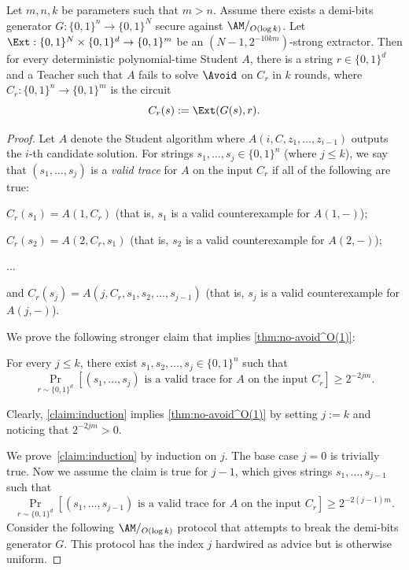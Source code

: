 \begin{theorem}\label{thm:no-avoid^O(1)}
    Let $m, n, k$ be parameters such that $m > n$. Assume there exists a demi-bits generator $G: \{0,1\}^n \to \{0,1\}^N$ secure against $\AM/_{O(\log k)}$. Let $\Ext: \{0,1\}^N \times \{0,1\}^d \to \{0,1\}^m$ be an $(N-1, 2^{-10km})$-strong extractor. Then for every deterministic polynomial-time Student $A$, there is a string $r\in \{0,1\}^d$ and a Teacher such that $A$ fails to solve $\Avoid$ on $C_r$ in $k$ rounds, where $C_r: \{0,1\}^n \to \{0,1\}^m$ is the circuit
    \[C_r(s) := \Ext(G(s), r).\]
\end{theorem}
\begin{proof}
    Let $A$ denote the Student algorithm where $A(i, C, z_1, \dots, z_{i-1})$ outputs the $i$-th candidate solution. For strings $s_1, \dots, s_j\in \{0,1\}^n$ (where $j\le k$), we say that $(s_1, \dots, s_j)$ is a \emph{valid trace} for $A$ on the input $C_r$ if all of the following are true:
    \begin{compactitem}
        \item $C_r(s_1) = A(1, C_r)$ (that is, $s_1$ is a valid counterexample for $A(1, -)$);
        \item $C_r(s_2) = A(2, C_r, s_1)$ (that is, $s_2$ is a valid counterexample for $A(2, -)$);
        \item $\dots$
        \item and $C_r(s_j) = A(j, C_r, s_1, s_2, \dots, s_{j-1})$ (that is, $s_j$ is a valid counterexample for $A(j, -)$).
    \end{compactitem}
    
    We prove the following stronger claim that implies \autoref{thm:no-avoid^O(1)}:
    
    \begin{claim}\label{claim:induction}
        For every $j\le k$, there exist $s_1, s_2, \dots, s_j \in \{0,1\}^n$ such that
        \[\Pr_{r\sim \{0,1\}^d}[(s_1, \dots, s_j)\text{ is a valid trace for $A$ on the input $C_r$}] \ge 2^{-2jm}.\]
    \end{claim}
    Clearly, \autoref{claim:induction} implies \autoref{thm:no-avoid^O(1)} by setting $j := k$ and noticing that $2^{-2jm} > 0$.

    We prove~\autoref{claim:induction} by induction on $j$. The base case $j=0$ is trivially true. Now we assume the claim is true for $j-1$, which gives strings $s_1,\dots,s_{j-1}$ such that
    \[\Pr_{r\sim \{0,1\}^d}[(s_1, \dots, s_{j-1})\text{ is a valid trace for $A$ on the input $C_r$}] \ge 2^{-2(j-1)m}.\]
    Consider the following $\AM/_{O(\log k)}$ protocol that attempts to break the demi-bits generator $G$. This protocol has the index $j$ hardwired as advice but is otherwise uniform.



\end{proof}
